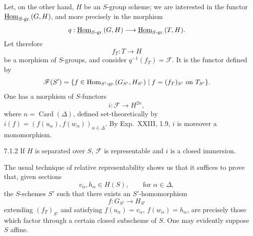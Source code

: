 Let, on the other hand, $H$ be an $S$-group scheme; we are interested in the functor $\underline{\operatorname{Hom}}_{S\text{-gr.}}(G,H)$, and more precisely in the morphism
\[
q:\underline{\operatorname{Hom}}_{S\text{-gr.}}(G,H)\longrightarrow\underline{\operatorname{Hom}}_{S\text{-gr.}}(T,H).
\]
Let therefore
\[
f_T:T\to H
\]
be a morphism of $S$-groups, and consider $q^{-1}(f_T)=\mathscr F$. It is the functor defined by
\[
\mathscr F(S')=\{f\in\operatorname{Hom}_{S'\text{-gr.}}(G_{S'},H_{S'})\mid f=(f_T)_{S'}\text{ on }T_{S'}\}.
\]
One has a morphism of $S$-functors
\[
i:\mathscr F\to H^{2n},
\]
where $n=\operatorname{Card}(\Delta)$, defined set-theoretically by $i(f)=(f(u_\alpha),f(w_\alpha))_{\alpha\in\Delta}$. By Exp.~XXIII, 1.9, $i$ is moreover a monomorphism.
\begin{proposition}{7.1.2}\label{XXIV.7.1.2}
If $H$ is separated over $S$, $\mathscr F$ is representable and $i$ is a closed immersion.
\end{proposition}
The usual technique of relative representability shows us that it suffices to prove that, given sections
\[
v_\alpha,h_\alpha\in H(S),\qquad\text{for }\alpha\in\Delta,
\]
the $S$-schemes $S'$ such that there exists an $S'$-homomorphism
\[
f:G_{S'}\to H_{S'}
\]
extending $(f_T)_{S'}$ and satisfying $f(u_\alpha)=v_\alpha$, $f(w_\alpha)=h_\alpha$, are precisely those which factor through a certain closed subscheme of $S$. One may evidently suppose $S$ affine.

